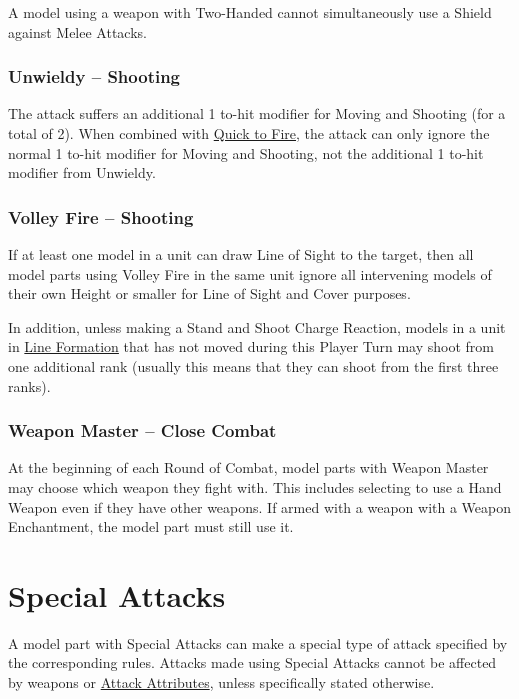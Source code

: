 A model using a weapon with Two-Handed cannot simultaneously use a Shield against Melee Attacks.

\subsubsection{Unwieldy -- Shooting}
\idx[main=y]{\unwieldy}\label{unwieldy}

The attack suffers an additional \minuss{}1 to-hit modifier for Moving and Shooting (for a total of \minuss{}2). When combined with \hyperref[quick_to_fire]{Quick to Fire}, the attack can only ignore the normal \minuss{}1 to-hit modifier for Moving and Shooting, not the additional \minuss{}1 to-hit modifier from Unwieldy.

\subsubsection{Volley Fire -- Shooting}
\idx[main=y]{\volleyfire}\label{volley_fire}

If at least one model in a unit can draw Line of Sight to the target, then all model parts using Volley Fire in the same unit ignore all intervening models of their own Height or smaller for Line of Sight and Cover purposes.

In addition, unless making a Stand and Shoot Charge Reaction, models in a unit in \hyperref[line_formation]{Line Formation} that has not moved during this Player Turn may shoot from one additional rank (usually this means that they can shoot from the first three ranks).

\subsubsection{Weapon Master -- Close Combat}
\idx[main=y]{\weaponmaster}\label{weapon_master}

At the beginning of each Round of Combat, model parts with Weapon Master may choose which weapon they fight with. This includes selecting to use a Hand Weapon even if they have other weapons. If armed with a weapon with a Weapon Enchantment, the model part must still use it.

\section{Special Attacks}
\idx[main=y]{\specialattacks}\label{special_attacks}

A model part with Special Attacks can make a special type of attack specified by the corresponding rules. Attacks made using Special Attacks cannot be affected by weapons or \hyperref[attack_attributes]{Attack Attributes}, unless specifically stated otherwise.

